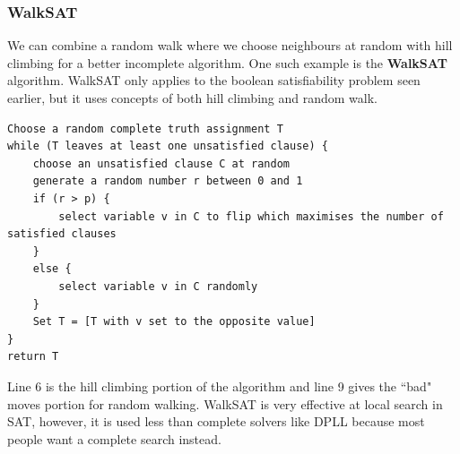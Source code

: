 \documentclass{article}
\begin{document}
\subsubsection{WalkSAT}
We can combine a random walk where we choose neighbours at random with hill climbing for a better incomplete algorithm. One such example is the \textbf{WalkSAT} algorithm. WalkSAT only applies to the boolean satisfiability problem seen earlier, but it uses concepts of both hill climbing and random walk. 
\begin{lstlisting}[caption={WalkSAT algorithm}, label=algo:walksat]
Choose a random complete truth assignment T
while (T leaves at least one unsatisfied clause) {
	choose an unsatisfied clause C at random
	generate a random number r between 0 and 1
	if (r > p) {
		select variable v in C to flip which maximises the number of satisfied clauses
	}
	else {
		select variable v in C randomly
	}
	Set T = [T with v set to the opposite value]
}
return T
\end{lstlisting}
\noindent
Line 6 is the hill climbing portion of the algorithm and line 9 gives the ``bad" moves portion for random walking. WalkSAT is very effective at local search in SAT, however, it is used less than complete solvers like DPLL because most people want a complete search instead.
\end{document}
